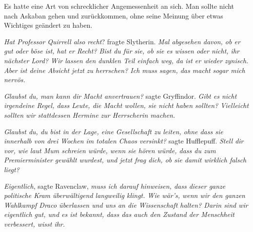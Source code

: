 Es hatte eine Art von schrecklicher Angemessenheit an sich. Man sollte nicht nach Askaban gehen und zurückkommen, ohne seine Meinung über etwas Wichtiges geändert zu haben.

\emph{Hat Professor Quirrell also recht}? fragte Slytherin. \emph{Mal abgesehen davon, ob er gut oder böse ist, hat er \emph{Recht}? Bist du für sie, ob sie es wissen oder nicht, ihr nächster Lord? Wir lassen den dunklen Teil einfach weg, da ist er wieder zynisch. Aber ist deine Absicht jetzt zu herrschen? Ich muss sagen, das macht sogar \emph{mich} nervös.}

\emph{Glaubst du, man kann dir Macht anvertrauen?} sagte Gryffindor. \emph{Gibt es nicht irgendeine Regel, dass Leute, die Macht wollen, sie nicht haben sollten? Vielleicht sollten wir stattdessen Hermine zur Herrscherin machen.}

\emph{Glaubst du, du bist in der Lage, eine Gesellschaft zu leiten, ohne dass sie innerhalb von drei Wochen im totalen Chaos versinkt?} sagte Hufflepuff. \emph{Stell dir vor, wie laut Mum schreien würde, wenn sie hören würde, dass du zum Premierminister gewählt wurdest, und jetzt frag dich, ob sie damit wirklich falsch liegt?}

\emph{Eigentlich}, sagte Ravenclaw, \emph{muss ich darauf hinweisen, dass dieser ganze politische Kram überwältigend langweilig klingt. Wie wär’s, wenn wir den ganzen Wahlkampf Draco überlassen und uns an die Wissenschaft halten? Darin sind wir eigentlich gut, und es ist bekannt, dass das auch den Zustand der Menschheit verbessert, wisst ihr.}

